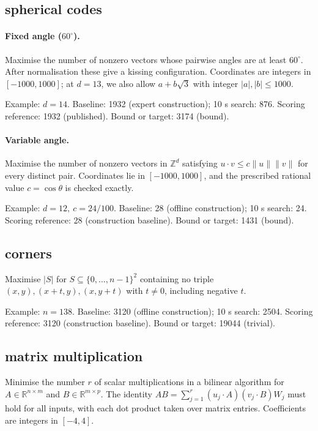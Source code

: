 \subsection{spherical codes}

\paragraph{Fixed angle ($60^\circ$).} Maximise the number of nonzero vectors whose pairwise angles are at least $60^\circ$. After normalisation these give a kissing configuration. Coordinates are integers in $[-1000,1000]$; at $d=13$, we also allow $a+b\sqrt3$ with integer $|a|,|b|\le1000$.

Example: $d=14$. Baseline: 1932 (expert construction); 10 s search: 876. Scoring reference: 1932 (published). Bound or target: 3174 (bound).

\paragraph{Variable angle.} Maximise the number of nonzero vectors in $\mathbb Z^d$ satisfying $u\cdot v\le c\|u\|\|v\|$ for every distinct pair. Coordinates lie in $[-1000,1000]$, and the prescribed rational value $c=\cos\theta$ is checked exactly.

Example: $d=12,\ c=24/100$. Baseline: 28 (offline construction); 10 s search: 24. Scoring reference: 28 (construction baseline). Bound or target: 1431 (bound).

\subsection{corners}

Maximise $|S|$ for $S\subseteq\{0,\ldots,n-1\}^2$ containing no triple $(x,y),(x+t,y),(x,y+t)$ with $t\ne0$, including negative $t$.

Example: $n=138$. Baseline: 3120 (offline construction); 10 s search: 2504. Scoring reference: 3120 (construction baseline). Bound or target: 19044 (trivial).

\subsection{matrix multiplication}

Minimise the number $r$ of scalar multiplications in a bilinear algorithm for $A\in\mathbb R^{n\times m}$ and $B\in\mathbb R^{m\times p}$. The identity $AB=\sum_{j=1}^r (u_j\cdot A)(v_j\cdot B)W_j$ must hold for all inputs, with each dot product taken over matrix entries. Coefficients are integers in $[-4,4]$.

